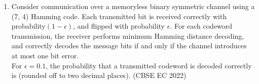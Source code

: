 \begin{enumerate}[label=\thechapter.\arabic*,ref=\thechapter.\theenumi]
\item Consider communication over a memoryless binary symmetric channel using a
(7, 4) Hamming code. Each transmitted bit is received correctly with probability$(1 - \epsilon)$, and flipped with probability $\epsilon$. For each codeword transmission, the receiver
performs minimum Hamming distance decoding, and correctly decodes the message
bits if and only if the channel introduces at most one bit error.
\\For $\epsilon = 0.1$, the probability that a transmitted codeword is decoded correctly is
 \textunderscore\textunderscore\textunderscore\textunderscore\textunderscore\textunderscore (rounded off to two decimal places).
\hfill (CBSE EC 2022)
\\

\end{enumerate}
